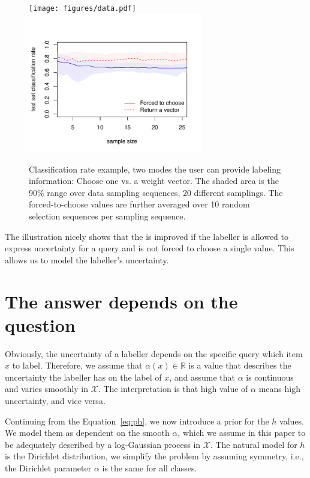 \documentclass[10pt, onecolumn]{article}
\newcommand{\R}{\mathbb{R}}
\newcommand{\X}{\mathcal{X}}
\begin{document}
\begin{figure}[hbtp]
\centering
\texttt{[image: figures/data.pdf]}
\includegraphics[width=3in]{figures/choose1_vs_give_vector.pdf}
\caption{Classification rate example, two modes the user can provide
  labeling information: Choose one vs. a weight vector. The shaded
  area is the 90\% range over data sampling sequences, 20 different
  samplings. The forced-to-choose values are further averaged over 10
  random selection sequences per sampling sequence.}
 \label{fig:sampling1}
\end{figure}

The illustration nicely shows that the is improved if the labeller is
allowed to express uncertainty for a query and is not forced to choose
a single value. This allows us to model the labeller's uncertainty.



\section{The answer depends on the question}
\label{sec:labeller}

Obviously, the uncertainty of a labeller depends on the specific query
which item $x$ to label. Therefore, we assume that $\alpha(x)\in \R$
is a value that describes the uncertainty the labeller has on the
label of $x$, and assume that $\alpha$ is continuous and varies
smoothly in $\X$. The interpretation is that high value of $\alpha$
means high uncertainty, and vice versa.  

Continuing from the Equation~\ref{eq:ph}, we now introduce a prior for
the $h$ values. We model them as dependent on the smooth $\alpha$,
which we assume in this paper to be adequately described by a
log-Gaussian process in $\X$. The natural model for $h$ is the
Dirichlet distribution, we simplify the problem by assuming symmetry,
i.e., the Dirichlet parameter $\alpha$ is the same for all classes. 
\end{document}
